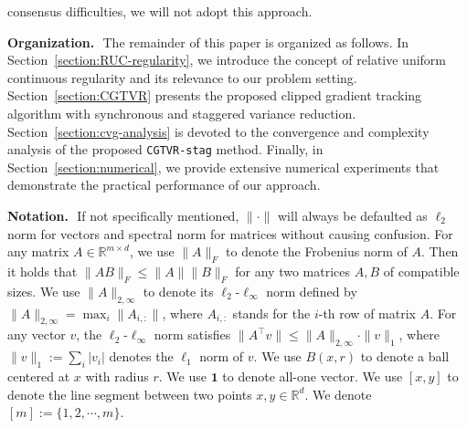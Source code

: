 \documentclass{article}
\newcommand{\RR}{\mathbb{R}}
\begin{document}
consensus difficulties, we will not adopt this approach.\vspace{0.25cm}




\noindent\textbf{\large Organization.}$\,\,$
The remainder of this paper is organized as follows. In Section~\ref{section:RUC-regularity}, we introduce the concept of relative uniform continuous regularity and its relevance to our problem setting. Section~\ref{section:CGTVR} presents the proposed clipped gradient tracking algorithm with synchronous and staggered variance reduction. Section~\ref{section:cvg-analysis} is devoted to the convergence and complexity analysis of the proposed \texttt{CGTVR-stag} method. Finally, in Section~\ref{section:numerical}, we provide extensive numerical experiments that demonstrate the practical performance of our approach. 

\vspace{0.25cm}



\noindent\textbf{\large Notation.}$\,\,$ If not specifically mentioned, $\|\cdot\|$ will always be defaulted as $\ell_2$ norm for vectors and spectral norm for matrices without causing confusion. For any matrix $A\in\RR^{m\times d}$, we use $\|A\|_F$ to denote the Frobenius norm of $A$. Then it holds that $\|AB\|_F\leq \|A\|\|B\|_F$ for any two matrices $A,B$ of compatible sizes. We use $\|A\|_{2,\infty}$ to denote its $\ell_2$-$\ell_\infty$ norm defined by $\|A\|_{2,\infty} = \max_{i}\|A_{i,:}\|$, where $A_{i,:}$ stands for the $i$-th row of matrix $A$. For any vector $v$, the $\ell_2$-$\ell_\infty$ norm satisfies $\|A^\top v\|\leq \|A\|_{2,\infty}\cdot\|v\|_1$, where $\|v\|_1:=\sum_i |v_i|$ denotes the $\ell_1$ norm of $v$. We use $B(x, r)$ to denote a ball centered at $x$ with radius $r$. We use $\mathbf{1}$ to denote all-one vector. We use $[x,y]$ to denote the line segment between two points  $x,y\in\RR^d.$ We denote $[m] := \{1, 2, \cdots, m\}.$
\end{document}
